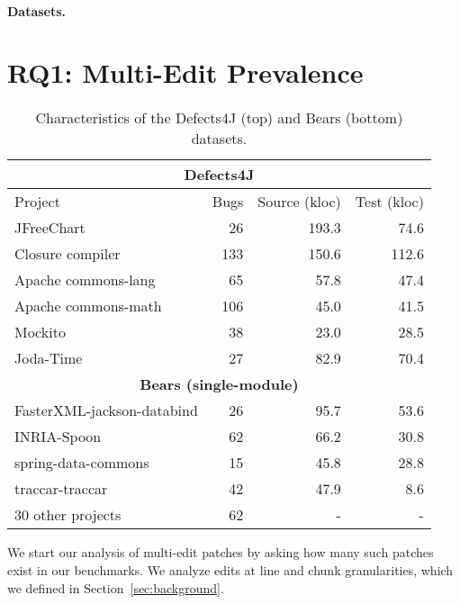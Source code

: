 \documentclass[sigconf, timestamp-false, anonymous=true]{acmart}
\begin{document}
\paragraph{Datasets.}  

\section{RQ1: Multi-Edit Prevalence}
\label{sec:data-rq1}

\begin{table}
\begin{tabular}{l | rrr}
\toprule
\multicolumn{4}{c}{\textbf{Defects4J}} \\
\midrule
Project & Bugs & Source (kloc) & Test (kloc) \\
\midrule
JFreeChart  & 26 & 193.3 & 74.6 \\
Closure compiler & 133 & 150.6 & 112.6 \\
Apache commons-lang & 65 & 57.8 & 47.4 \\
Apache commons-math & 106 & 45.0 & 41.5 \\
Mockito & 38 & 23.0 & 28.5 \\
Joda-Time & 27 & 82.9 & 70.4 \\
\midrule
\multicolumn{4}{c}{\textbf{Bears (single-module)}} \\
\midrule
FasterXML-jackson-databind & 26 & 95.7 & 53.6 \\
INRIA-Spoon & 62 & 66.2 & 30.8 \\
spring-data-commons & 15 & 45.8 & 28.8 \\
traccar-traccar & 42 & 47.9 & 8.6 \\
30 other projects & 62 & - & -\\
\bottomrule
\end{tabular}
\caption{\label{tab:data} Characteristics of the Defects4J (top) and Bears (bottom) datasets.}
\end{table}


We start our analysis of multi-edit patches by asking how many such patches 
exist in our benchmarks. We analyze edits at line and chunk granularities,
which we defined in Section~\ref{sec:background}.
\end{document}
